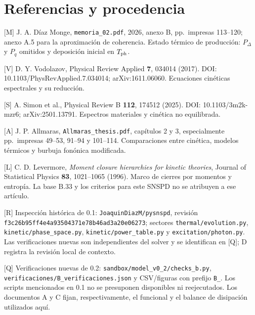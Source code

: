 \documentclass[
  spanish,
  10pt,
  a4paper,
]{article}
\begin{document}
\section{Referencias y procedencia}\label{referencias-y-procedencia}

{[}M{]} J. A. Díaz Monge, \nolinkurl{memoria_02.pdf}, 2026, anexo B,
pp.~impresas 113--120; anexo A.5 para la aproximación de coherencia.
Estado térmico de producción: \(P_\Delta\) y \(P_q\) omitidos y
deposición inicial en \(T_{\rm ph}\).

{[}V{]} D. Y. Vodolazov, Physical Review Applied \textbf{7}, 034014
(2017). DOI: 10.1103/PhysRevApplied.7.034014; arXiv:1611.06060.
Ecuaciones cinéticas espectrales y su reducción.

{[}S{]} A. Simon et al., Physical Review B \textbf{112}, 174512 (2025).
DOI: 10.1103/3m2k-mzr6; arXiv:2501.13791. Espectros materiales y
cinética no equilibrada.

{[}A{]} J. P. Allmaras, \nolinkurl{Allmaras_thesis.pdf}, capítulos 2 y 3,
especialmente pp.~impresas 49--53, 91--94 y 101--114. Comparaciones
entre cinética, modelos térmicos y burbuja fonónica modificada.

{[}L{]} C. D. Levermore, \emph{Moment closure hierarchies for kinetic
theories}, Journal of Statistical Physics \textbf{83}, 1021--1065
(1996). Marco de cierres por momentos y entropía. La base B.33 y los
criterios para este SNSPD no se atribuyen a ese artículo.

{[}R{]} Inspección histórica de 0.1: \nolinkurl{JoaquinDiazM/pysnspd},
revisión \nolinkurl{f3c26b95ff4e4a93504371e78b46ad3a20e06273}; sectores
\nolinkurl{thermal/evolution.py}, \nolinkurl{kinetic/phase_space.py},
\nolinkurl{kinetic/power_table.py} y \nolinkurl{excitation/photon.py}. Las
verificaciones nuevas son independientes del solver y se identifican en
{[}Q{]}; D registra la revisión local de contexto.

{[}Q{]} Verificaciones nuevas de 0.2:
\nolinkurl{sandbox/model_v0_2/checks_b.py},
\nolinkurl{verificaciones/B_verificaciones.json} y CSV/figuras con prefijo
\nolinkurl{B_}. Los scripts mencionados en 0.1 no se presuponen
disponibles ni reejecutados. Los documentos A y C fijan,
respectivamente, el funcional y el balance de disipación utilizados
aquí.
\end{document}
